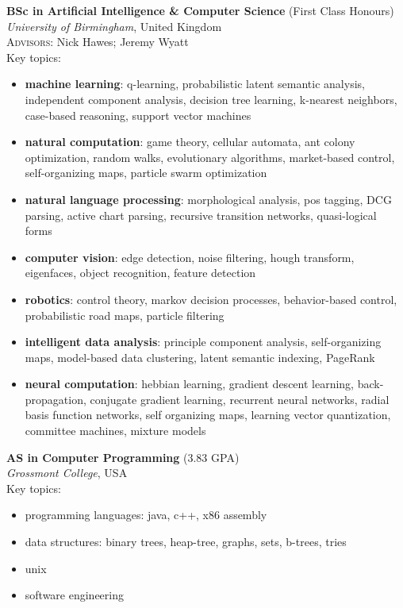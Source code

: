 \documentclass[10pt, a4paper]{article}
\newcommand{\years}[1]{\marginnote{\scriptsize #1}}
\begin{document}
\years{2012}
\textbf{BSc in Artificial Intelligence \& Computer Science} (First Class Honours)\\
\textsl{University of Birmingham}, United Kingdom\\
\small{\textsc{Advisors:} Nick Hawes; Jeremy Wyatt}\\[.2cm]
Key topics:
\begin{itemize}
\item \textbf{machine learning}: q-learning, probabilistic latent
  semantic analysis, independent component analysis, decision tree
  learning, k-nearest neighbors, case-based reasoning, support vector
  machines
\item \textbf{natural computation}: game theory, cellular automata, ant
  colony optimization, random walks, evolutionary algorithms,
  market-based control, self-organizing maps, particle swarm
  optimization
\item \textbf{natural language processing}: morphological analysis,
  pos tagging, DCG parsing, active chart parsing, recursive transition
  networks, quasi-logical forms
\item \textbf{computer vision}: edge detection, noise filtering, hough
  transform, eigenfaces, object recognition, feature detection
\item \textbf{robotics}: control theory, markov decision processes,
  behavior-based control, probabilistic road maps, particle filtering
\item \textbf{intelligent data analysis}: principle component
  analysis, self-organizing maps, model-based data clustering, latent
  semantic indexing, PageRank
\item \textbf{neural computation}: hebbian learning, gradient descent
  learning, back-propagation, conjugate gradient learning, recurrent
  neural networks, radial basis function networks, self organizing
  maps, learning vector quantization, committee machines, mixture
  models
\end{itemize}
\vspace{.25cm}

\years{2009}
\textbf{AS in Computer Programming} (3.83 GPA)\\
\textit{Grossmont College}, USA\\[.2cm]
Key topics:
\begin{itemize}
\item programming languages: java, c++, x86 assembly
\item data structures: binary trees, heap-tree, graphs, sets,
  b-trees, tries
\item unix
\item software engineering
\end{itemize}
\end{document}
